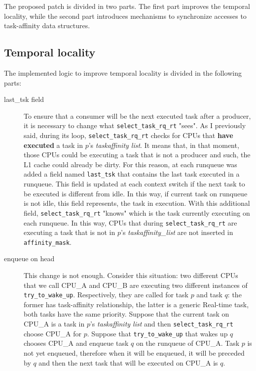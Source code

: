 The proposed patch is divided in two parts. The first part improves the temporal locality, while the second part introduces mechanisms to synchronize 
accesses to task-affinity data structures.

\subsection{Temporal locality}

The implemented logic to improve temporal locality is divided in the following parts:

\begin{description}

\item[last\_tsk field] To ensure that a consumer will be the next executed task after a producer, it is necessary to change what 
\texttt{select\_task\_rq\_rt} "sees". As I previously said, during its loop, \texttt{select\_task\_rq\_rt} checks for CPUs that \textbf{have executed} a 
task in $p$'s \textit{taskaffinity list}. It means that, in that moment, those
CPUs could be executing a task that is not a producer and such, the L1 cache 
could already be dirty. For this reason, at each runqueue was added a field named \texttt{last\_tsk} that contains the last task executed in a runqueue. 
This field is updated at each context switch if the next task to be executed is different from idle. In this way, if current task on runqueue is not idle, 
this field represents, the task in execution. With this additional field, \texttt{select\_task\_rq\_rt} "knows" which is the task currently executing on 
each runqueue. In this way, CPUs that during \texttt{select\_task\_rq\_rt} are executing a task that is not in $p$'s \textit{taskaffinity\_list} are not 
inserted in \texttt{affinity\_mask}.

\item[enqueue on head] This change is not enough. Consider this situation: two
different CPUs that we call CPU\_A and CPU\_B are executing two different 
instances of \texttt{try\_to\_wake\_up}. Respectively, they are called for task $p$ and task $q$: the former has task-affinity relationship, the latter is 
a generic Real-time task, both tasks have the same priority. Suppose that the current task on CPU\_A is a task in $p$'s \textit{taskaffinity list} and then 
\texttt{select\_task\_rq\_rt} choose CPU\_A for $p$. Suppose that \texttt{try\_to\_wake\_up} that wakes up $q$ chooses CPU\_A and enqueue task $q$ on the 
runqueue of CPU\_A. Task $p$ is not yet enqueued, therefore when it will be enqueued, it will be preceded by $q$ and then the next task that will
be executed on CPU\_A is $q$.


\end{description}
